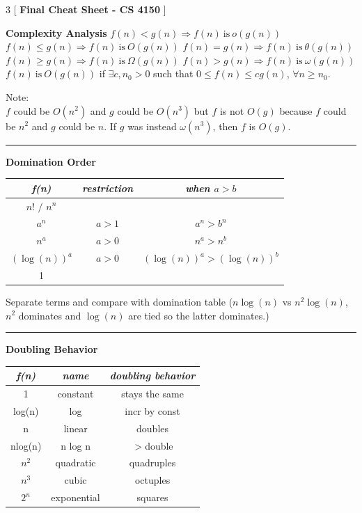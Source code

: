 \documentclass[9pt]{amsart}
\begin{document}
\begin{multicols*}{3}
  [
    \textbf{Final Cheat Sheet - CS 4150}
  ]

  \textbf{Complexity Analysis}
  \newline
  $f(n) < g(n) \Rightarrow f(n)\ \text{is}\ o(g(n))$
  \newline 
  $f(n) \leq g(n) \Rightarrow f(n)\ \text{is}\ O(g(n))$
  \newline
  $f(n) = g(n) \Rightarrow f(n)\ \text{is}\ \theta(g(n))$
  \newline
  $f(n) \geq g(n) \Rightarrow f(n)\ \text{is}\ \Omega(g(n))$
  \newline
  $f(n) > g(n) \Rightarrow f(n)\ \text{is}\ \omega(g(n))$
  \vskip 5pt
  $f(n)\ \text{is}\ O(g(n))$ if $\exists c, n_0 > 0$ such that
  $0 \leq f(n) \leq cg(n)$, $\forall n \geq n_0$.

  \vskip 5pt

  Note: \\
  $f$ could be $O(n^2)$ and $g$ could be $O(n^3)$ but $f$ is not $O(g)$ because $f$ could be $n^2$ and $g$ could be $n$. If $g$ was instead $\omega(n^3)$, then $f$ is $O(g)$.
  
  \vskip 7pt
  \hrule
  \vskip 7pt

  \textbf{Domination Order}
  \footnotesize
  \begin{center}
  \begin{tabular}{c | c | c}
     \emph{f(n)} & \emph{restriction} & \emph{when $a > b$} \\
     \hline
     $n! \text{ / } n^n$ & & \\
     \hline
     $a^n$ & $a > 1$ & $a^n > b^n$ \\
     \hline
     $n^a$ & $a > 0$ & $n^a > n^b$ \\
     \hline
     $(\log(n))^a$ & $a > 0$ & $(\log(n))^a > (\log(n))^b$ \\
     \hline
     1 & &
  \end{tabular}
  \end{center}
  \normalsize
  Separate terms and compare with domination table ($n \log(n)$ vs $n^2 \log(n)$, $n^2$ 
  dominates and $\log(n)$ are tied so the latter dominates.)

  \vskip 7pt
  \hrule
  \vskip 7pt

  \textbf{Doubling Behavior}
  \footnotesize
  \begin{center}
  \begin{tabular}{c | c | c}
     \emph{f(n)} & \emph{name} & \emph{doubling behavior} \\
     \hline
     1 & constant & stays the same \\
     \hline
     log(n) & log & incr by const \\
     \hline
     n & linear & doubles \\
     \hline
     nlog(n) & n log n & $>$double \\
     \hline
     $n^2$ & quadratic & quadruples \\
     \hline
     $n^3$ & cubic & octuples \\
     \hline
     $2^n$ & exponential & squares
  \end{tabular}
  \end{center}
  \normalsize


\end{multicols*}
\end{document}
